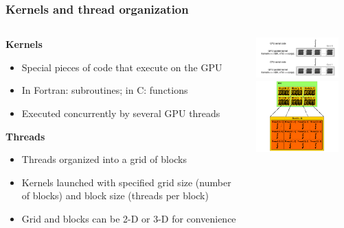 \begin{frame}
\frametitle{Kernels and thread organization}
\begin{columns}
\begin{column}{0.5\textwidth}
\textbf{Kernels}
\begin{itemize}
\item Special pieces of code that execute on the GPU
\item In Fortran: subroutines; in C: functions
\item Executed concurrently by several GPU threads
\end{itemize}
\textbf{Threads}
\begin{itemize}
\item Threads organized into a grid of blocks
\item Kernels launched with specified grid size
    (number of blocks) and block size (threads per block)
\item Grid and blocks can be 2-D or 3-D for convenience
\end{itemize}
\end{column}
\begin{column}{0.5\textwidth}
\includegraphics[width=120px]{img/program-structure.png}
\vspace{1cm}
\includegraphics[width=120px]{img/grid-of-thread-blocks.png}
\end{column}
\end{columns}
\end{frame}

